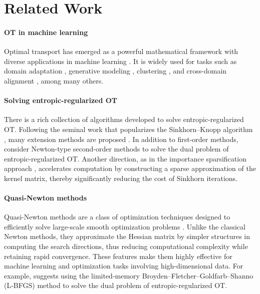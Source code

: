 \documentclass{article}
\theoremstyle{plain}
\theoremstyle{definition}
\theoremstyle{remark}
\begin{document}
\section{Related Work}
\label{sec:related_work}

\paragraph{OT in machine learning}
Optimal transport has emerged as a powerful mathematical framework with diverse applications in machine learning \citep{torres2021survey,montesuma2024recent}. It is widely used for tasks such as domain adaptation \citep{courty2017optimal}, generative modeling \citep{arjovsky2017wasserstein,genevay2018learning,huynh2021optimal}, clustering \citep{laclau2017co}, and cross-domain alignment \citep{chen2020graph}, among many others.

\paragraph{Solving entropic-regularized OT}
There is a rich collection of algorithms developed to solve entropic-regularized OT. Following the seminal work \citet{cuturi2013sinkhorn} that popularizes the Sinkhorn--Knopp algorithm \citep{yule1912methods,sinkhorn1964relationship}, many extension methods are proposed \citep{altschuler2017nearlinear,dvurechensky2018computational,guminov2021combination,lin2022efficiency}.
In addition to first-order methods, \citet{brauer2017sinkhorn,tang2024accelerating,tang2024safe} consider Newton-type second-order methods to solve the dual problem of entropic-regularized OT.
Another direction, as in the importance sparsification approach \citep{li2023importance},
accelerates computation by constructing a sparse approximation of the kernel matrix, thereby significantly reducing the cost of Sinkhorn iterations.

\paragraph{Quasi-Newton methods}
Quasi-Newton methods are a class of optimization techniques designed to efficiently solve large-scale smooth optimization problems \citep{nocedal2006numerical}. Unlike the classical Newton methods, they approximate the Hessian matrix by simpler structures in computing the search directions, thus reducing computational complexity while retaining rapid convergence. 
These features make them highly effective for machine learning and optimization tasks involving high-dimensional data. For example, \citet{cuturi2018semidual} suggests using the limited-memory Broyden–Fletcher–Goldfarb–Shanno (L-BFGS) method \citep{liu1989limited} to solve the dual problem of entropic-regularized OT.
\end{document}
